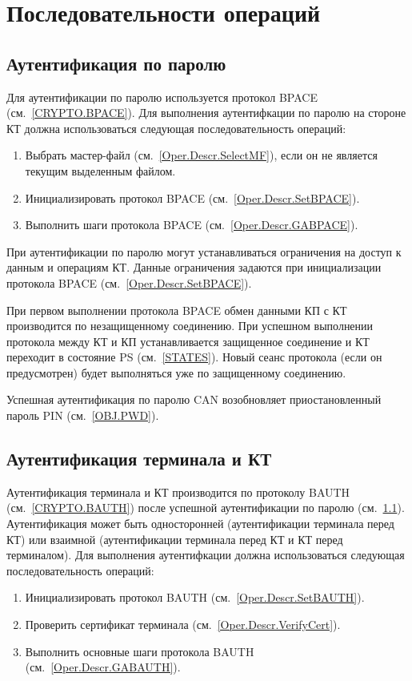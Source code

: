 \section{Последовательности операций}
\label{Oper.Seq}

\subsection{Аутентификация по паролю}
\label{Oper.Seq.BPACE}

Для аутентификации по паролю используется протокол BPACE (см.~\ref{CRYPTO.BPACE}). 
Для выполнения аутентифкации по паролю на стороне КТ должна 
использоваться следующая последовательность операций:

\begin{enumerate}
\item Выбрать мастер-файл (см.~\ref{Oper.Descr.SelectMF}), 
если он не является текущим выделенным файлом.

\item Инициализировать протокол BPACE (см.~\ref{Oper.Descr.SetBPACE}).

\item Выполнить шаги протокола BPACE (см.~\ref{Oper.Descr.GABPACE}).

\end{enumerate}

При аутентификации по паролю могут устанавливаться ограничения 
на доступ к данным и операциям КТ.
Данные ограничения задаются при инициализации 
протокола BPACE (см.~\ref{Oper.Descr.SetBPACE}).

При первом выполнении протокола BPACE обмен данными КП с КТ производится 
по незащищенному соединению. При успешном выполнении протокола между КТ и 
КП устанавливается защищенное соединение и КТ переходит в состояние PS
(см.~\ref{STATES}). Новый сеанс протокола (если он 
предусмотрен) будет выполняться уже по защищенному соединению. 

Успешная аутентификация по паролю CAN возобновляет приостановленный 
пароль PIN (см.~\ref{OBJ.PWD}).

\subsection{Аутентификация терминала и КТ}
\label{Oper.Seq.BAUTH}

Аутентификация терминала и КТ производится по протоколу BAUTH 
(см.~\ref{CRYPTO.BAUTH}) после успешной аутентификации по паролю 
(см.~\ref{Oper.Seq.BPACE}). Аутентификация может быть односторонней 
(аутентификации терминала перед КТ) или взаимной (аутентификации терминала 
перед КТ и КТ перед терминалом). Для выполнения аутентифкации должна 
использоваться следующая последовательность операций:
%
\begin{enumerate}
\item Инициализировать протокол BAUTH (см.~\ref{Oper.Descr.SetBAUTH}).
\item Проверить сертификат терминала (см.~\ref{Oper.Descr.VerifyCert}).
\item Выполнить основные шаги протокола BAUTH (см.~\ref{Oper.Descr.GABAUTH}).
\end{enumerate}

